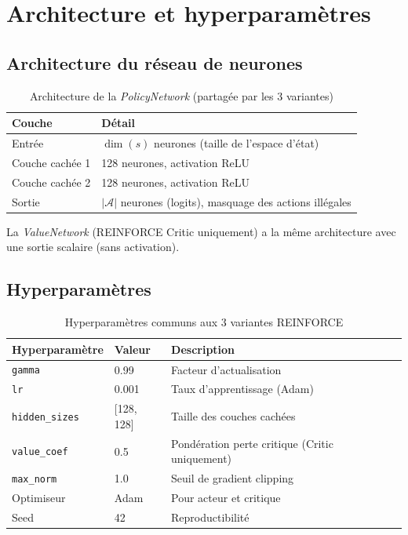 \documentclass[12pt,a4paper]{article}
\begin{document}
\section{Architecture et hyperparamètres}

\subsection{Architecture du réseau de neurones}

\begin{table}[H]
\centering
\caption{Architecture de la \textit{PolicyNetwork} (partagée par les 3 variantes)}
\begin{tabular}{ll}
\toprule
\textbf{Couche} & \textbf{Détail} \\
\midrule
Entrée & $\dim(s)$ neurones (taille de l'espace d'état) \\
Couche cachée 1 & 128 neurones, activation ReLU \\
Couche cachée 2 & 128 neurones, activation ReLU \\
Sortie & $|\mathcal{A}|$ neurones (logits), masquage des actions illégales \\
\bottomrule
\end{tabular}
\end{table}

La \textit{ValueNetwork} (REINFORCE Critic uniquement) a la même architecture avec une sortie scalaire (sans activation).

\subsection{Hyperparamètres}

\begin{table}[H]
\centering
\caption{Hyperparamètres communs aux 3 variantes REINFORCE}
\begin{tabular}{lll}
\toprule
\textbf{Hyperparamètre} & \textbf{Valeur} & \textbf{Description} \\
\midrule
\texttt{gamma} & 0.99 & Facteur d'actualisation \\
\texttt{lr} & 0.001 & Taux d'apprentissage (Adam) \\
\texttt{hidden\_sizes} & [128, 128] & Taille des couches cachées \\
\texttt{value\_coef} & 0.5 & Pondération perte critique (Critic uniquement) \\
\texttt{max\_norm} & 1.0 & Seuil de gradient clipping \\
Optimiseur & Adam & Pour acteur et critique \\
Seed & 42 & Reproductibilité \\
\bottomrule
\end{tabular}
\end{table}
\end{document}
